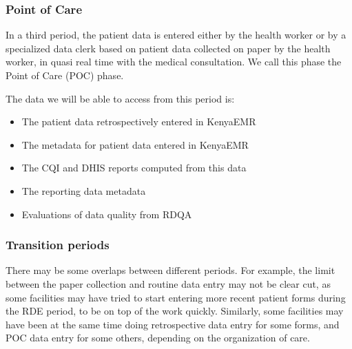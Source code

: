 \subsubsection{Point of Care}

In a third period, the patient data is entered either by the health worker or by a specialized data clerk based on patient data collected on paper by the health worker, in quasi real time with the medical consultation. We call this phase the Point of Care (POC) phase.

The data we will be able to access from this period is:
\begin{itemize}
	\item	The patient data retrospectively entered in KenyaEMR
	\item	The metadata for patient data entered in KenyaEMR
	\item	The CQI and DHIS reports computed from this data
	\item	The reporting data metadata
	\item	Evaluations of data quality from RDQA
\end{itemize}

\subsubsection{Transition periods}

There may be some overlaps between different periods. For example, the limit between the paper collection and routine data entry may not be clear cut, as some facilities may have tried to start entering more recent patient forms during the RDE period, to be on top of the work quickly. Similarly, some facilities may have been at the same time doing retrospective data entry for some forms, and POC data entry for some others, depending on the organization of care.

